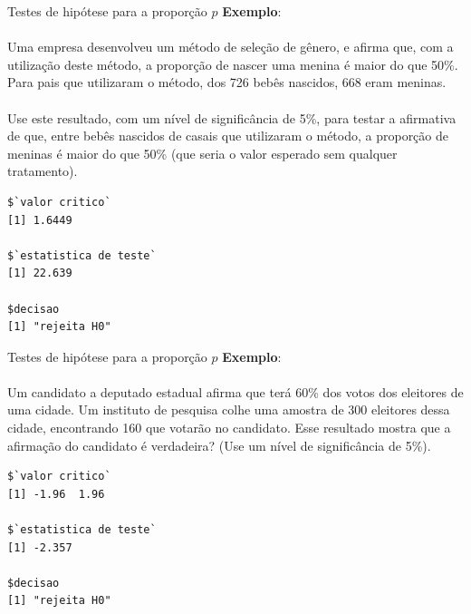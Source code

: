 \documentclass[10pt]{beamer}\usepackage[]{graphicx}\usepackage[]{color}
\makeatletter
\newenvironment{kframe}{%
 \def\at@end@of@kframe{}%
 \ifinner\ifhmode%
  \def\at@end@of@kframe{\end{minipage}}%
  \begin{minipage}{\columnwidth}%
 \fi\fi%
 \def\FrameCommand##1{\hskip\@totalleftmargin \hskip-\fboxsep
 \colorbox{shadecolor}{##1}\hskip-\fboxsep
     \hskip-\linewidth \hskip-\@totalleftmargin \hskip\columnwidth}%
 \MakeFramed {\advance\hsize-\width
   \@totalleftmargin\z@ \linewidth\hsize
   \@setminipage}}%
 {\par\unskip\endMakeFramed%
 \at@end@of@kframe}
\newenvironment{knitrout}{}{} %
\theoremstyle{definition}
\makeatother
\begin{document}
\begin{frame}[fragile]{Testes de hipótese para a proporção $p$}
  \textbf{Exemplo}: \\~\\
  Uma empresa desenvolveu um método de seleção de gênero, e
  afirma que, com a utilização deste método, a proporção de nascer uma
  menina é maior do que 50\%. Para pais que utilizaram o método, dos 726
  bebês nascidos, 668 eram meninas.\\~\\
  Use este resultado, com um nível de significância de 5\%, para testar
  a afirmativa de que, entre bebês nascidos de casais que utilizaram o
  método, a proporção de meninas é maior do que 50\% (que seria o valor
  esperado sem qualquer tratamento).
  \pause
\begin{knitrout}\footnotesize
{}\color{fgcolor}\begin{kframe}
\begin{verbatim}
$`valor critico`
[1] 1.6449

$`estatistica de teste`
[1] 22.639

$decisao
[1] "rejeita H0"
\end{verbatim}
\end{kframe}
\end{knitrout}
\end{frame}

\begin{frame}[fragile]{Testes de hipótese para a proporção $p$}
  \textbf{Exemplo}: \\~\\
  Um candidato a deputado estadual afirma que terá 60\% dos
  votos dos eleitores de uma cidade. Um instituto de pesquisa colhe uma
  amostra de 300 eleitores dessa cidade, encontrando 160 que votarão no
  candidato. Esse resultado mostra que a afirmação do candidato é
  verdadeira? (Use um nível de significância de 5\%).
  \pause
\begin{knitrout}\footnotesize
{}\color{fgcolor}\begin{kframe}
\begin{verbatim}
$`valor critico`
[1] -1.96  1.96

$`estatistica de teste`
[1] -2.357

$decisao
[1] "rejeita H0"
\end{verbatim}
\end{kframe}
\end{knitrout}
\end{frame}
\end{document}

